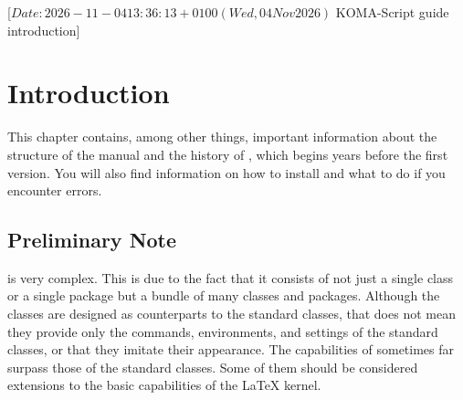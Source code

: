 %
%
%
%
%
%
%

                 [$Date: 2026-11-04 13:36:13 +0100 (Wed, 04 Nov 2026) $
                  KOMA-Script guide introduction]

\chapter{Introduction}

This chapter contains, among other things, important information about the
structure of the manual and the history of {\KOMAScript}, which begins
years before the first version. You will also find information on how to
install {\KOMAScript} and what to do if you encounter errors.

\section{Preliminary Note}

{\KOMAScript} is very complex. This is due to the fact that it consists of not
just a single class or a single package but a bundle of many classes and
packages. Although the classes are designed as counterparts to the standard
classes, that does not mean they provide only the commands, environments, and
settings of the standard classes, or that they imitate their appearance. The
capabilities of {\KOMAScript} sometimes far surpass those of the standard
classes. Some of them should be considered extensions to the basic
capabilities of the \LaTeX{} kernel.

